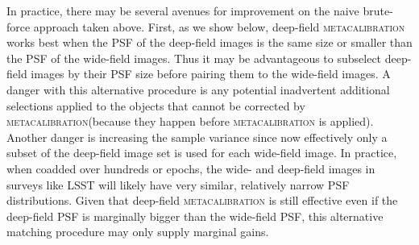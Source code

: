 \documentclass[twocolumn]{openjournal}
\makeatletter
\newcommand{\mcal}{\textsc{metacalibration}\@\xspace}
\makeatother
\begin{document}
In practice, there may be several avenues for improvement on the naive brute-force
approach taken above. First, as we show below, deep-field \mcal works best when the PSF
of the deep-field images is the same size or smaller than the PSF of the wide-field
images. Thus it may be advantageous to subselect deep-field images by their PSF size
before pairing them to the wide-field images. A danger with this alternative procedure
is any potential inadvertent additional selections applied to the objects that cannot be
corrected by \mcal (because they happen before \mcal is applied). Another danger is
increasing the sample variance since now effectively only a subset of the deep-field
image set is used for each wide-field image. In practice, when coadded over hundreds or
epochs, the wide- and deep-field images in surveys like LSST will likely have very
similar, relatively narrow PSF distributions. Given that deep-field \mcal is still
effective even if the deep-field PSF is marginally bigger than the wide-field PSF, this
alternative matching procedure may only supply marginal gains.
\end{document}
